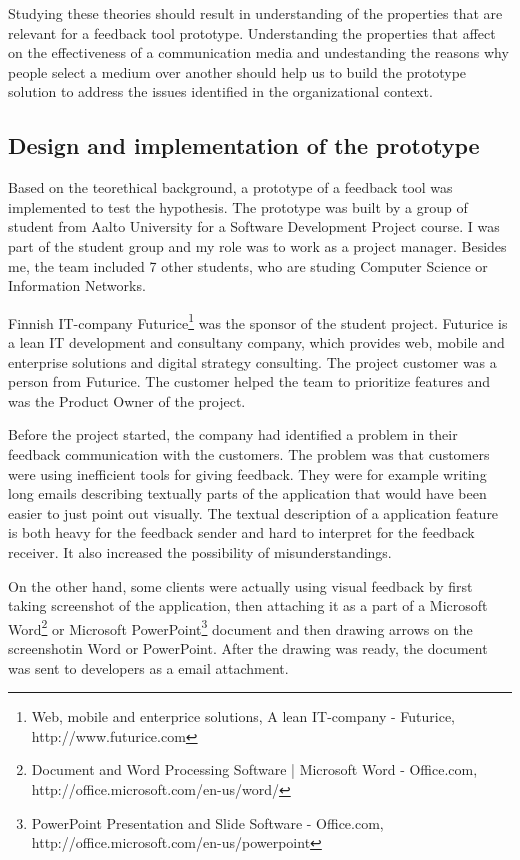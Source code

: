 \documentclass[english,12pt,a4paper,pdftex]{article}
\begin{document}
Studying these theories should result in understanding of the properties that are relevant for a feedback tool prototype. Understanding the properties that affect on the effectiveness of a communication media and undestanding the reasons why people select a medium over another should help us to build the prototype solution to address the issues identified in the organizational context.

\subsection{Design and implementation of the prototype}

Based on the teorethical background, a prototype of a feedback tool was implemented to test the hypothesis. The prototype was built by a group of student from Aalto University for a Software Development Project course. I was part of the student group and my role was to work as a project manager. Besides me, the team included 7 other students, who are studing Computer Science or Information Networks.

Finnish IT-company Futurice\footnote{Web, mobile and enterprice solutions, A lean IT-company - Futurice, http://www.futurice.com} was the sponsor of the student project. Futurice is a lean IT development and consultany company, which provides web, mobile and enterprise solutions and digital strategy consulting. The project customer was a person from Futurice. The customer helped the team to prioritize features and was the Product Owner of the project. 

Before the project started, the company had identified a problem in their feedback communication with the customers. The problem was that customers were using inefficient tools for giving feedback. They were for example writing long emails describing textually parts of the application that would have been easier to just point out visually. The textual description of a application feature is both heavy for the feedback sender and hard to interpret for the feedback receiver. It also increased the possibility of misunderstandings.

On the other hand, some clients were actually using visual feedback by first taking screenshot of the application, then attaching it as a part of a Microsoft Word\footnote{Document and Word Processing Software | Microsoft Word - Office.com, http://office.microsoft.com/en-us/word/} or Microsoft PowerPoint\footnote{PowerPoint Presentation and Slide Software - Office.com, http://office.microsoft.com/en-us/powerpoint} document and then drawing arrows on the screenshotin Word or PowerPoint. After the drawing was ready, the document was sent to developers as a email attachment. 
\end{document}
